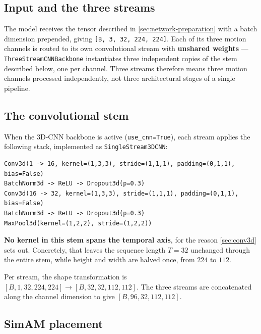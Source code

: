 \subsection{Input and the three streams}
\label{sec:input-streams}

The model receives the tensor described in \autoref{sec:network-preparation} with a batch dimension prepended, giving \texttt{[B, 3, 32, 224, 224]}. Each of its three motion channels is routed to its own convolutional stream with \textbf{unshared weights} --- \texttt{ThreeStreamCNNBackbone} instantiates three independent copies of the stem described below, one per channel. Three streams therefore means three motion channels processed independently, not three architectural stages of a single pipeline.

\subsection{The convolutional stem}
\label{sec:conv-stem}

When the 3D-CNN backbone is active (\texttt{use\_cnn=True}), each stream applies the following stack, implemented as \texttt{SingleStream3DCNN}:

\begin{verbatim}
Conv3d(1 -> 16, kernel=(1,3,3), stride=(1,1,1), padding=(0,1,1), bias=False)
BatchNorm3d -> ReLU -> Dropout3d(p=0.3)
Conv3d(16 -> 32, kernel=(1,3,3), stride=(1,1,1), padding=(0,1,1), bias=False)
BatchNorm3d -> ReLU -> Dropout3d(p=0.3)
MaxPool3d(kernel=(1,2,2), stride=(1,2,2))
\end{verbatim}

\textbf{No kernel in this stem spans the temporal axis}, for the reason \autoref{sec:conv3d} sets out. Concretely, that leaves the sequence length $T=32$ unchanged through the entire stem, while height and width are halved once, from $224$ to $112$.

Per stream, the shape transformation is $[B,1,32,224,224] \rightarrow [B,32,32,112,112]$. The three streams are concatenated along the channel dimension to give $[B,96,32,112,112]$.

\subsection{SimAM placement}
\label{sec:simam-placement}

